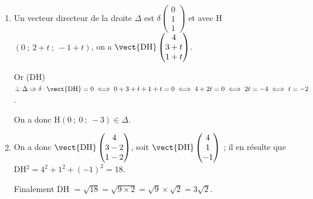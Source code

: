 \begin{enumerate}
\begin{enumerate}
Soit H le projeté orthogonal du point D sur la droite $\Delta$.
		\item %
Un vecteur directeur de la droite $\Delta$ est $\delta\begin{pmatrix}0\\1\\1\end{pmatrix}$ et avec H$(0~;~2 + t~;~- 1 + t)$, on a $\vect{\text{DH}}\begin{pmatrix}4\\3 + t\\1 + t\end{pmatrix}$.

Or (DH) $\perp \Delta \Rightarrow \delta \cdot \vect{\text{DH}} = 0 \iff 0 + 3 + t + 1 + t = 0 \iff 4 + 2t = 0 \iff 2t = - 4 \iff t = - 2$.

On a donc H$(0~;~0~;~- 3) \in \Delta$.
		\item %
On a donc $\vect{\text{DH}}\begin{pmatrix}4\\3 - 2\\1 - 2\end{pmatrix}$, soit $\vect{\text{DH}}\begin{pmatrix}4\\1\\- 1\end{pmatrix}$ ; il en résulte que DH$^2 = 4^2 +1^2 + (- 1)^2 = 18$.
		
Finalement DH $= \sqrt{18} = \sqrt{9 \times 2} = \sqrt 9 \times \sqrt 2 = 3\sqrt 2$.
	\end{enumerate}
\end{enumerate}


\bigskip

